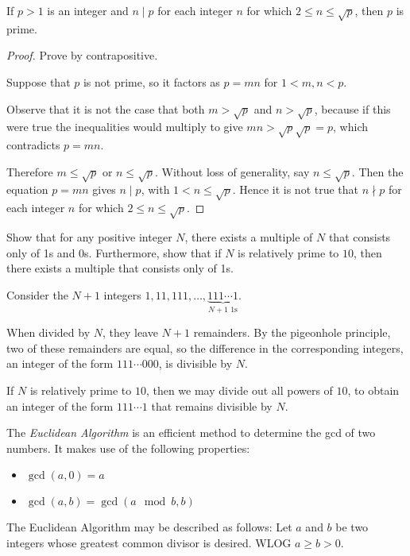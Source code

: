 \begin{proposition}
If $p>1$ is an integer and $n\mid p$ for each integer $n$ for which $2\le n\le\sqrt{p}$, then $p$ is prime.
\end{proposition}

\begin{proof}
Prove by contrapositive.

Suppose that $p$ is not prime, so it factors as $p=mn$ for $1<m,n<p$.

Observe that it is not the case that both $m>\sqrt{p}$ and $n>\sqrt{p}$, because if this were true the inequalities would multiply to give $mn>\sqrt{p}\sqrt{p}=p$, which contradicts $p=mn$.

Therefore $m\le\sqrt{p}$ or $n\le\sqrt{p}$. Without loss of generality, say $n\le\sqrt{p}$. Then the equation $p=mn$ gives $n\mid p$, with $1<n\le\sqrt{p}$. Hence it is not true that $n\nmid p$ for each integer $n$ for which $2\le n\le\sqrt{p}$.
\end{proof}

\begin{exercise}
Show that for any positive integer $N$, there exists a multiple of $N$ that consists only of 1s and 0s. Furthermore, show that if $N$ is relatively prime to $10$, then there exists a multiple that consists only of 1s.
\end{exercise}

\begin{solution}
Consider the $N+1$ integers $1,11,111,\dots,\underbrace{111\cdots1}_{N+1\text{ 1s}}$.

When divided by $N$, they leave $N+1$ remainders. By the pigeonhole principle, two of these remainders are equal, so the difference in the corresponding integers, an integer of the form $111\cdots000$, is divisible by $N$.

If $N$ is relatively prime to $10$, then we may divide out all powers of $10$, to obtain an integer of the form $111\cdots1$ that remains divisible by $N$.
\end{solution}

The \emph{Euclidean Algorithm} is an efficient method to determine the gcd of two numbers. It makes use of the following properties:
\begin{itemize}
\item $\gcd(a,0) = a$
\item $\gcd(a,b) = \gcd(a \mod b,b)$
\end{itemize}

The Euclidean Algorithm may be described as follows: Let $a$ and $b$ be two integers whose greatest common divisor is desired. WLOG $a\ge b>0$.

